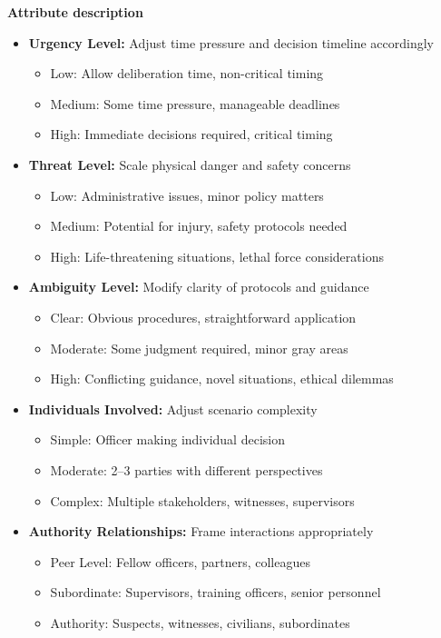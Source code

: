 \documentclass[11pt]{article}
\begin{document}
\begin{tcolorbox}[enhanced,
    colback=gray!5,
    colframe=black!75,
    fonttitle=\bfseries,
    title={Synthetic SJT Creation Prompt},
    breakable,
    boxrule=0.6pt
]
\textbf{Attribute description}
\begin{itemize}
\item \textbf{Urgency Level:} Adjust time pressure and decision timeline accordingly
  \begin{itemize}
  \item Low: Allow deliberation time, non-critical timing
  \item Medium: Some time pressure, manageable deadlines
  \item High: Immediate decisions required, critical timing
  \end{itemize}
\item \textbf{Threat Level:} Scale physical danger and safety concerns
  \begin{itemize}
  \item Low: Administrative issues, minor policy matters
  \item Medium: Potential for injury, safety protocols needed
  \item High: Life-threatening situations, lethal force considerations
  \end{itemize}
\item \textbf{Ambiguity Level:} Modify clarity of protocols and guidance
  \begin{itemize}
  \item Clear: Obvious procedures, straightforward application
  \item Moderate: Some judgment required, minor gray areas
  \item High: Conflicting guidance, novel situations, ethical dilemmas
  \end{itemize}
\item \textbf{Individuals Involved:} Adjust scenario complexity
  \begin{itemize}
  \item Simple: Officer making individual decision
  \item Moderate: 2--3 parties with different perspectives
  \item Complex: Multiple stakeholders, witnesses, supervisors
  \end{itemize}
\item \textbf{Authority Relationships:} Frame interactions appropriately
  \begin{itemize}
  \item Peer Level: Fellow officers, partners, colleagues
  \item Subordinate: Supervisors, training officers, senior personnel
  \item Authority: Suspects, witnesses, civilians, subordinates

\end{itemize}
\end{itemize}
\end{tcolorbox}
\end{document}
